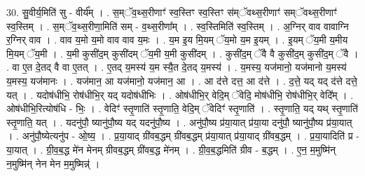 \documentclass[17pt]{extarticle}
\begin{document}
30. सु॒वीर्य॒मिति॑ सु - वीर्य᳚म् । . स॒म्ॅव॒थ्स॒रीणाꣳ॑ स्व॒स्तिꣳ स्व॒स्तिꣳ स॑म्ॅवथ्स॒रीणाꣳ॑ सम्ॅवथ्स॒रीणाꣳ॑ स्व॒स्तिम् । . स॒म्ॅव॒थ्स॒रीणा॒मिति॑ सम् - व॒थ्स॒रीणा᳚म् । . स्व॒स्तिमिति॑ स्व॒स्तिम् । . अ॒ग्निर् वाव वावाग्नि र॒ग्निर् वाव । . वाव य॒मो य॒मो वाव वाव य॒मः । . य॒म इ॒य मि॒यम् ॅय॒मो य॒म इ॒यम् । . इ॒यम् ॅय॒मी य॒मीय मि॒यम् ॅय॒मी । . य॒मी कुसी॑द॒म् कुसी॑दम् ॅय॒मी य॒मी कुसी॑दम् । . कुसी॑द॒म् ॅवै वै कुसी॑द॒म् कुसी॑द॒म् ॅवै । . वा ए॒त दे॒तद् वै वा ए॒तत् । . ए॒तद् य॒मस्य॑ य॒म स्यै॒त दे॒तद् य॒मस्य॑ । . य॒मस्य॒ यज॑मानो॒ यज॑मानो य॒मस्य॑ य॒मस्य॒ यज॑मानः । . यज॑मान॒ आ यज॑मानो॒ यज॑मान॒ आ । . आ द॑त्ते दत्त॒ आ द॑त्ते । . द॒त्ते॒ यद् यद् द॑त्ते दत्ते॒ यत् । . यदोष॑धीभि॒ रोष॑धीभि॒र् यद् यदोष॑धीभिः । . ओष॑धीभि॒र् वेदि॒म् ॅवेदि॒ मोष॑धीभि॒ रोष॑धीभि॒र् वेदि᳚म् । . ओष॑धीभि॒रित्योष॑धि - भिः॒ । . वेदिꣳ॑ स्तृ॒णाति॑ स्तृ॒णाति॒ वेदि॒म् ॅवेदिꣳ॑ स्तृ॒णाति॑ । . स्तृ॒णाति॒ यद् यथ् स्तृ॒णाति॑ स्तृ॒णाति॒ यत् । . यदनु॑पौ॒ ष्यानु॑पौ॒ष्य यद् यदनु॑पौ॒ष्य । . अनु॑पौ॒ष्य प्र॑या॒यात् प्र॑या॒या दनु॑पौ॒ ष्यानु॑पौ॒ष्य प्र॑या॒यात् । . अनु॑पौ॒ष्येत्यनु॑प - ओ॒ष्य॒ । . प्र॒या॒याद् ग्री॑वब॒द्धम् ग्री॑वब॒द्धम् प्र॑या॒यात् प्र॑या॒याद् ग्री॑वब॒द्धम् । . प्र॒या॒यादिति॑ प्र - या॒यात् । . ग्री॒व॒ब॒द्ध मे॑न मेनम् ग्रीवब॒द्धम् ग्री॑वब॒द्ध मे॑नम् । . ग्री॒व॒ब॒द्धमिति॑ ग्रीव - ब॒द्धम् । . ए॒न॒ म॒मुष्मि॑न् न॒मुष्मि॑न् नेन मेन म॒मुष्मिन्न्॑ । \newline
\end{document}
